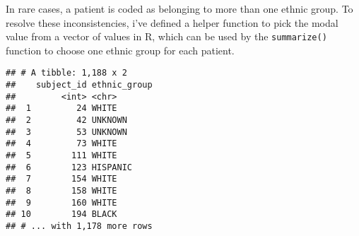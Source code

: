 \documentclass[]{article}
\newenvironment{Shaded}{\begin{snugshade}}{\end{snugshade}}
\newcommand{\KeywordTok}[1]{\textcolor[rgb]{0.13,0.29,0.53}{\textbf{#1}}}
\newcommand{\DataTypeTok}[1]{\textcolor[rgb]{0.13,0.29,0.53}{#1}}
\newcommand{\DecValTok}[1]{\textcolor[rgb]{0.00,0.00,0.81}{#1}}
\newcommand{\StringTok}[1]{\textcolor[rgb]{0.31,0.60,0.02}{#1}}
\newcommand{\OtherTok}[1]{\textcolor[rgb]{0.56,0.35,0.01}{#1}}
\newcommand{\ControlFlowTok}[1]{\textcolor[rgb]{0.13,0.29,0.53}{\textbf{#1}}}
\newcommand{\OperatorTok}[1]{\textcolor[rgb]{0.81,0.36,0.00}{\textbf{#1}}}
\newcommand{\NormalTok}[1]{#1}
\begin{document}
In rare cases, a patient is coded as belonging to more than one ethnic
group. To resolve these inconsistencies, i've defined a helper function
to pick the modal value from a vector of values in R, which can be used
by the \texttt{summarize()} function to choose one ethnic group for each
patient.

\begin{Shaded}
\end{Shaded}

\begin{verbatim}
## # A tibble: 1,188 x 2
##    subject_id ethnic_group
##         <int> <chr>       
##  1         24 WHITE       
##  2         42 UNKNOWN     
##  3         53 UNKNOWN     
##  4         73 WHITE       
##  5        111 WHITE       
##  6        123 HISPANIC    
##  7        154 WHITE       
##  8        158 WHITE       
##  9        160 WHITE       
## 10        194 BLACK       
## # ... with 1,178 more rows
\end{verbatim}

\begin{Shaded}
\end{Shaded}
\end{document}
